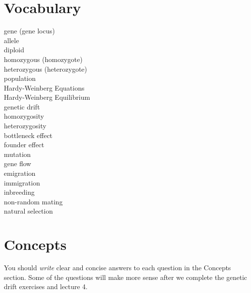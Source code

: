 \documentclass[letterpaper]{tufte-handout}
\begin{document}
\section{Vocabulary}
\vspace{-1\baselineskip}
\begin{multicols}{2}
gene (gene locus)\\
allele\\
diploid\\
homozygous (homozygote)\\
heterozygous (heterozygote)\\
population\\
Hardy-Weinberg Equations\\
Hardy-Weinberg Equilibrium\\
genetic drift\\
homozygosity\\
heterozygosity\\
bottleneck effect\\
founder effect\\
mutation\\
gene flow\\
emigration\\
immigration\\
inbreeding\\
non-random mating\\
natural selection\\
\end{multicols}

\section{Concepts}

You should \emph{write} clear and concise answers to each question in the Concepts section.  Some of the questions will make more sense after we complete the genetic drift exercises and lecture 4.
\end{document}
